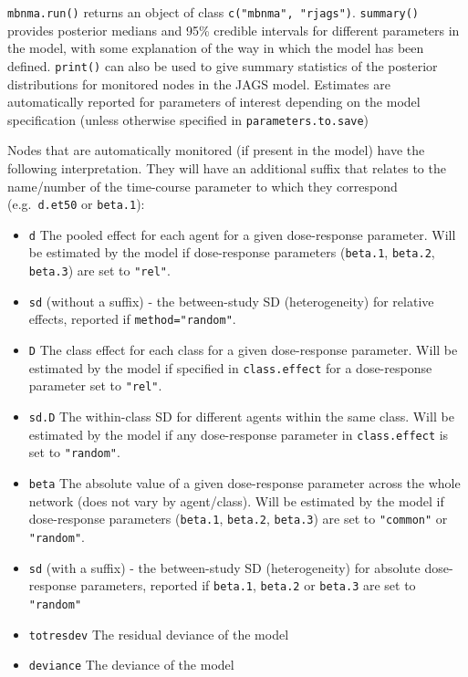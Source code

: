 \documentclass[]{article}
\providecommand{\tightlist}{%
  \setlength{\itemsep}{0pt}\setlength{\parskip}{0pt}}
\begin{document}
\texttt{mbnma.run()} returns an object of class
\texttt{c("mbnma",\ "rjags")}. \texttt{summary()} provides posterior
medians and 95\% credible intervals for different parameters in the
model, with some explanation of the way in which the model has been
defined. \texttt{print()} can also be used to give summary statistics of
the posterior distributions for monitored nodes in the JAGS model.
Estimates are automatically reported for parameters of interest
depending on the model specification (unless otherwise specified in
\texttt{parameters.to.save})

Nodes that are automatically monitored (if present in the model) have
the following interpretation. They will have an additional suffix that
relates to the name/number of the time-course parameter to which they
correspond (e.g.~\texttt{d.et50} or \texttt{beta.1}):

\begin{itemize}
\tightlist
\item
  \texttt{d} The pooled effect for each agent for a given dose-response
  parameter. Will be estimated by the model if dose-response parameters
  (\texttt{beta.1}, \texttt{beta.2}, \texttt{beta.3}) are set to
  \texttt{"rel"}.
\item
  \texttt{sd} (without a suffix) - the between-study SD (heterogeneity)
  for relative effects, reported if \texttt{method="random"}.
\item
  \texttt{D} The class effect for each class for a given dose-response
  parameter. Will be estimated by the model if specified in
  \texttt{class.effect} for a dose-response parameter set to
  \texttt{"rel"}.
\item
  \texttt{sd.D} The within-class SD for different agents within the same
  class. Will be estimated by the model if any dose-response parameter
  in \texttt{class.effect} is set to \texttt{"random"}.
\item
  \texttt{beta} The absolute value of a given dose-response parameter
  across the whole network (does not vary by agent/class). Will be
  estimated by the model if dose-response parameters (\texttt{beta.1},
  \texttt{beta.2}, \texttt{beta.3}) are set to \texttt{"common"} or
  \texttt{"random"}.
\item
  \texttt{sd} (with a suffix) - the between-study SD (heterogeneity) for
  absolute dose-response parameters, reported if \texttt{beta.1},
  \texttt{beta.2} or \texttt{beta.3} are set to \texttt{"random"}
\item
  \texttt{totresdev} The residual deviance of the model
\item
  \texttt{deviance} The deviance of the model
\end{itemize}
\end{document}
